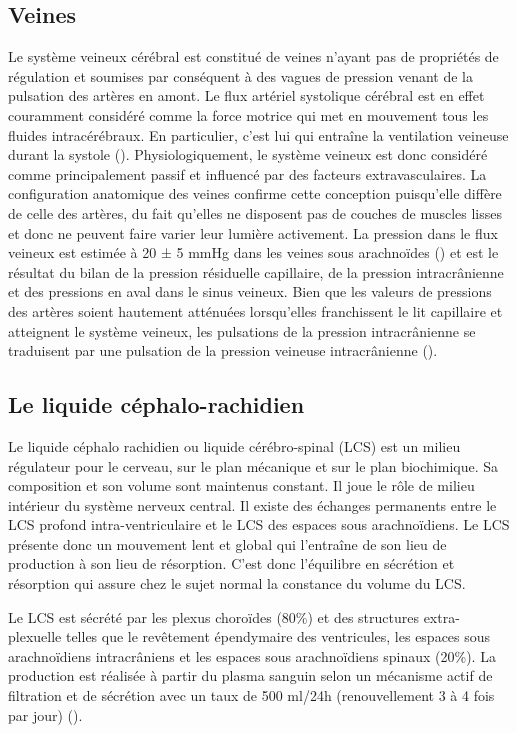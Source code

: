 \subsection{Veines }
Le système veineux cérébral est constitué de veines n’ayant pas de propriétés de régulation et
soumises par conséquent à des vagues de pression venant de la pulsation des artères en amont. Le
flux artériel systolique cérébral est en effet couramment considéré comme la force motrice qui met en
mouvement tous les fluides intracérébraux. En particulier, c’est lui qui entraîne la ventilation veineuse
durant la systole (\cite{Greitz1992}). Physiologiquement, le système veineux est donc considéré comme
principalement passif et influencé par des facteurs extravasculaires. La configuration anatomique des
veines confirme cette conception puisqu’elle diffère de celle des artères, du fait qu’elles ne disposent
pas de couches de muscles lisses et donc ne peuvent faire varier leur lumière activement. La pression
dans le flux veineux est estimée à 20 ± 5 mmHg dans les veines sous arachnoïdes (\cite{Ekstedt1978}) et est le résultat
du bilan de la pression résiduelle capillaire, de la pression intracrânienne et des pressions en aval dans
le sinus veineux. Bien que les valeurs de pressions des artères soient hautement atténuées lorsqu’elles
franchissent le lit capillaire et atteignent le système veineux, les pulsations de la pression
intracrânienne se traduisent par une pulsation de la pression veineuse intracrânienne (\cite{Elsankari2012}).

\subsection{Le liquide céphalo-rachidien}
Le liquide céphalo rachidien ou liquide cérébro-spinal (LCS) est un milieu régulateur pour le
cerveau, sur le plan mécanique et sur le plan biochimique. Sa composition et son volume sont
maintenus constant. Il joue le rôle de milieu intérieur du système nerveux central. Il existe des
échanges permanents entre le LCS profond intra-ventriculaire et le LCS des espaces sous
arachnoïdiens. Le LCS présente donc un mouvement lent et global qui l’entraîne de son lieu de
production à son lieu de résorption. C’est donc l’équilibre en sécrétion et résorption qui assure chez le
sujet normal la constance du volume du LCS.

Le LCS est sécrété par les plexus choroïdes (80\%) et des structures extra-plexuelle telles que le
revêtement épendymaire des ventricules, les espaces sous arachnoïdiens intracrâniens et les espaces
sous arachnoïdiens spinaux (20\%). La production est réalisée à partir du plasma sanguin selon un
mécanisme actif de filtration et de sécrétion avec un taux de 500 ml/24h (renouvellement 3 à 4 fois
par jour) (\cite{Maurer2010}).

